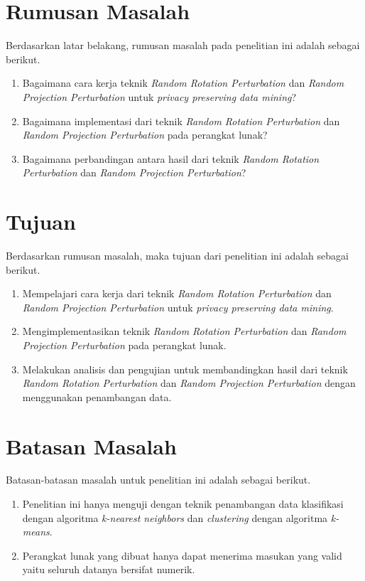 \section{Rumusan Masalah}
\label{sec:rumusan}
Berdasarkan latar belakang, rumusan masalah pada penelitian ini adalah sebagai berikut.
\begin{enumerate}
	\item Bagaimana cara kerja teknik \textit{Random Rotation Perturbation} dan \textit{Random Projection Perturbation} untuk \textit{privacy preserving data mining}?
	\item Bagaimana implementasi dari teknik \textit{Random Rotation Perturbation} dan \textit{Random Projection Perturbation} pada perangkat lunak?
	\item Bagaimana perbandingan antara hasil dari teknik \textit{Random Rotation Perturbation} dan \textit{Random Projection Perturbation}?
\end{enumerate}

\section{Tujuan}
\label{sec:tujuan}
Berdasarkan rumusan masalah, maka tujuan dari penelitian ini adalah sebagai berikut.
\begin{enumerate}
	\item Mempelajari cara kerja dari teknik \textit{Random Rotation Perturbation} dan \textit{Random Projection Perturbation} untuk \textit{privacy preserving data mining}.
	\item Mengimplementasikan teknik \textit{Random Rotation Perturbation} dan \textit{Random Projection Perturbation} pada perangkat lunak.
	\item Melakukan analisis dan pengujian untuk membandingkan hasil dari teknik \textit{Random Rotation Perturbation} dan \textit{Random Projection Perturbation} dengan menggunakan penambangan data.
\end{enumerate}

\section{Batasan Masalah}
\label{sec:batasan}
Batasan-batasan masalah untuk penelitian ini adalah sebagai berikut.
\begin{enumerate}
    \item Penelitian ini hanya menguji dengan teknik penambangan data klasifikasi dengan algoritma \textit{k-nearest neighbors} dan \textit{clustering} dengan algoritma \textit{k-means}.
    \item Perangkat lunak yang dibuat hanya dapat menerima masukan yang valid yaitu seluruh datanya bersifat numerik.
\end{enumerate}

